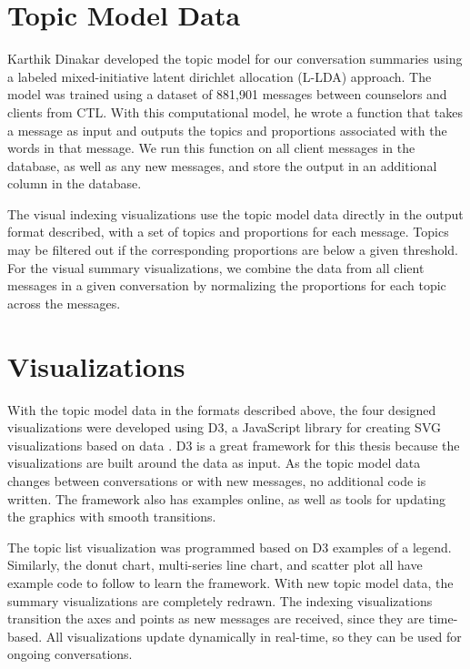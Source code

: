 \section{Topic Model Data}

Karthik Dinakar developed the topic model for our conversation summaries using a
labeled mixed-initiative latent dirichlet allocation (L-LDA) approach. The model was
trained using a dataset of 881,901 messages between counselors and clients from CTL.
With this computational model, he wrote a function that takes a message as input and
outputs the topics and proportions associated with the words in that message. We
run this function on all client messages in the database, as well as any new messages,
and store the output in an additional column in the database.

The visual indexing visualizations use the topic model data directly in the output
format described, with a set of topics and proportions for each message. Topics may
be filtered out if the corresponding proportions are below a given threshold. For the
visual summary visualizations, we combine the data from all client messages in a
given conversation by normalizing the proportions for each topic across the messages.

\section{Visualizations}

With the topic model data in the formats described above, the four designed
visualizations were developed using D3, a JavaScript library for creating SVG visualizations
based on data \cite{d3, d3website}. D3 is a great framework for this thesis because the visualizations
are built around the data as input. As the topic model data changes between
conversations or with new messages, no additional code is written. The framework
also has examples online, as well as tools for updating the graphics with smooth transitions.

The topic list visualization was programmed based on D3 examples of a legend.
Similarly, the donut chart, multi-series line chart, and scatter plot all have example
code to follow to learn the framework. With new topic model data, the summary
visualizations are completely redrawn. The indexing visualizations transition the axes
and points as new messages are received, since they are time-based. All visualizations
update dynamically in real-time, so they can be used for ongoing conversations.

